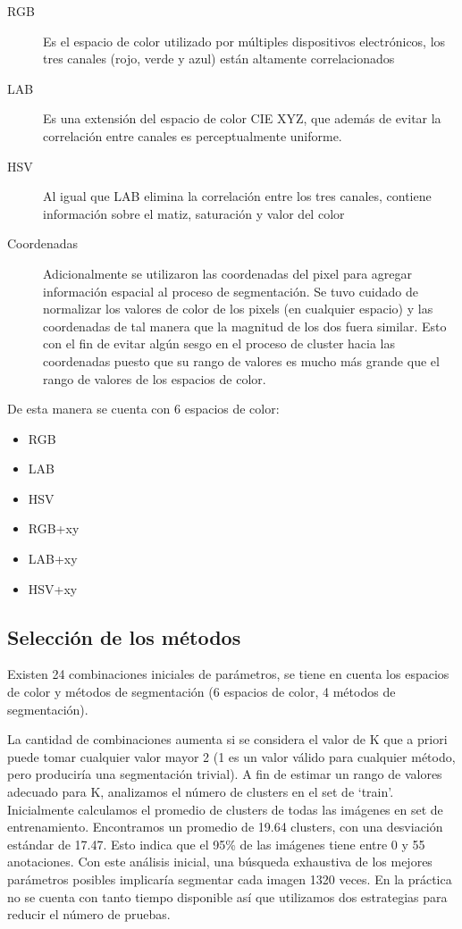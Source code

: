 \documentclass[10pt,twocolumn,letterpaper]{article}
\begin{document}
\begin{description}
\item[RGB] Es el espacio de color utilizado por múltiples dispositivos electrónicos, los tres canales (rojo, verde y azul) están altamente correlacionados \cite{Forsyth2002}
\item[LAB] Es una extensión del espacio de color CIE XYZ, que además de evitar la correlación entre canales es perceptualmente uniforme.\cite{Forsyth2002}
\item[HSV] Al igual que LAB elimina la correlación entre los tres canales,  contiene información sobre el matiz, saturación y valor del color\cite{Forsyth2002}
\item[Coordenadas] Adicionalmente se utilizaron las coordenadas del pixel para agregar información espacial al proceso de segmentación.  Se tuvo cuidado de  normalizar los valores de color de los pixels (en cualquier espacio) y las coordenadas de tal manera que la magnitud de los dos fuera similar. Esto con el fin de evitar algún sesgo en el proceso de cluster hacia las coordenadas puesto que su rango de valores es mucho más grande que el rango de valores de los espacios de color.
\end{description}
De esta manera se cuenta con 6 espacios de color:

\begin{itemize}
\item RGB
\item LAB
\item HSV
\item RGB+xy
\item LAB+xy
\item HSV+xy
\end{itemize}


\subsection{Selección de los métodos}

Existen 24 combinaciones iniciales de parámetros, se tiene en cuenta los espacios de color y métodos de segmentación (6 espacios de color, 4 métodos de segmentación).

La cantidad de combinaciones aumenta si se considera  el valor de K que a priori puede tomar cualquier valor mayor 2 (1 es un valor válido para cualquier método, pero produciría una segmentación trivial). A fin de estimar un rango de valores adecuado para K, analizamos el número de clusters en el set de ‘train’. Inicialmente calculamos el promedio de clusters de todas las imágenes en set de entrenamiento. Encontramos un promedio de 19.64 clusters, con una desviación estándar de 17.47. Esto indica que el 95\% de las imágenes tiene entre 0 y 55 anotaciones. Con este análisis inicial, una búsqueda exhaustiva de los mejores parámetros posibles implicaría segmentar cada imagen  1320 veces.  En la práctica no se cuenta con tanto tiempo disponible así que utilizamos dos estrategias para reducir el número de pruebas.
\end{document}
